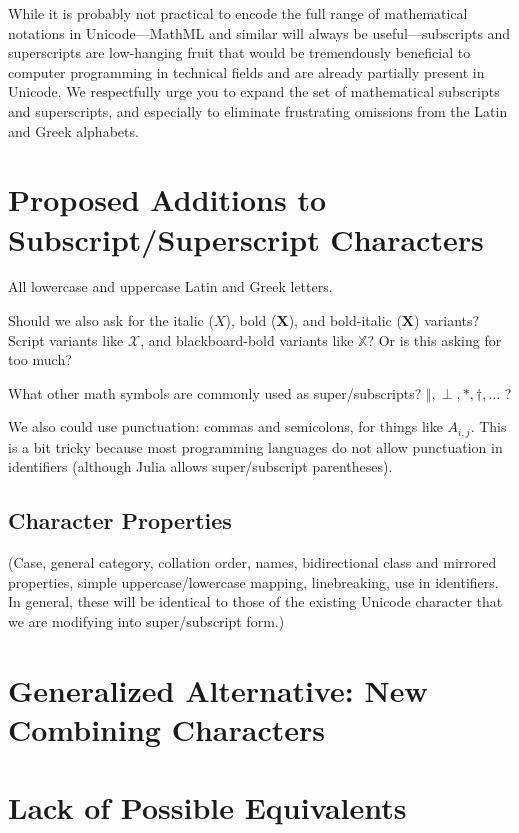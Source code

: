 \documentclass[10pt,english]{article}
\begin{document}
While it is probably not practical to encode the full range of mathematical
notations in Unicode---MathML and similar will always be useful---subscripts
and superscripts are low-hanging fruit that would be tremendously
beneficial to computer programming in technical fields and are already
partially present in Unicode. We respectfully urge you to expand the
set of mathematical subscripts and superscripts, and especially to
eliminate frustrating omissions from the Latin and Greek alphabets.


\section{Proposed Additions to Subscript/Superscript Characters}

All lowercase and uppercase Latin and Greek letters.

Should we also ask for the italic ($\mathit{{X}}$), bold ($\mathbf{{X}}$),
and bold-italic ($\mathbf{\mathit{\boldsymbol{{X}}}}$) variants?
Script variants like $\mathscr{X}$, and blackboard-bold variants
like $\mathbb{{X}}$? Or is this asking for too much?

What other math symbols are commonly used as super/subscripts? $\Vert,\perp,*,\dagger,\ldots$
?

We also could use punctuation: commas and semicolons, for things like
$A_{i,j}$. This is a bit tricky because most programming languages
do not allow punctuation in identifiers (although Julia allows super/subscript
parentheses). 


\subsection{Character Properties}

(Case, general category, collation order, names, bidirectional class
and mirrored properties, simple uppercase/lowercase mapping, linebreaking,
use in identifiers. In general, these will be identical to those of
the existing Unicode character that we are modifying into super/subscript
form.)


\section{Generalized Alternative: New Combining Characters}


\section{Lack of Possible Equivalents}
\end{document}
